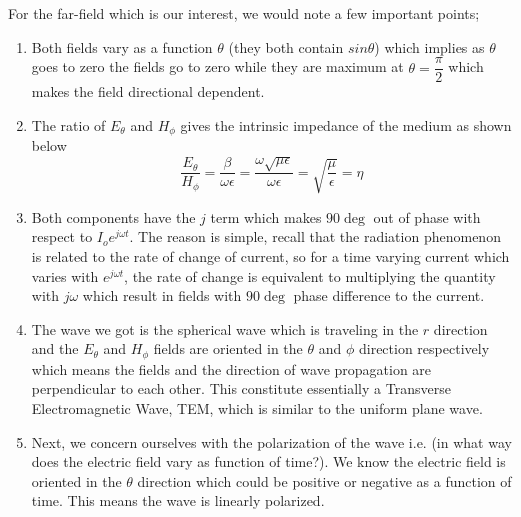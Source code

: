 For the far-field which is our interest, we would note a few important points;
\begin{enumerate}
\item Both fields vary as a function $\theta$ (they both contain $sin\theta$) which implies as $\theta$ goes to zero the fields go to zero while they are maximum at $\theta = \dfrac{\pi}{2}$ which makes the field directional dependent. 
\item The ratio of $E_{\theta}$ and  $H_{\phi}$ gives the intrinsic impedance of the medium as shown below
$$\dfrac{E_{\theta}}{H_{\phi}} = \dfrac{\beta}{\omega  \epsilon} = \dfrac{\omega \sqrt{\mu \epsilon}}{\omega  \epsilon} = \sqrt{\dfrac{\mu}{\epsilon}} = \eta $$
\item Both components have the $j$ term which makes $90\deg$ out of phase with respect to $I_oe^{j\omega t}$. The reason is simple, recall that the radiation phenomenon is related to the rate of change of current, so for a time varying current which varies with $e^{j\omega t}$, the rate of change is equivalent to multiplying the quantity with $j\omega $ which result in fields with $90\deg$ phase difference to the current.
\item The wave we got is the spherical wave which is traveling in the $r$ direction and the $E_\theta$ and $H_\phi$ fields are oriented in the $\theta$ and $\phi$ direction respectively which means the fields and the direction of wave propagation are perpendicular to each other. This constitute essentially a Transverse Electromagnetic Wave, TEM, which is similar to the uniform plane wave.
\item Next, we concern ourselves with the polarization of the wave i.e. (in what way does the electric field vary as function of time?). We know the electric field is oriented in the $\theta$ direction which could be positive or negative as a function of time. This means the wave is linearly polarized.
\end{enumerate}